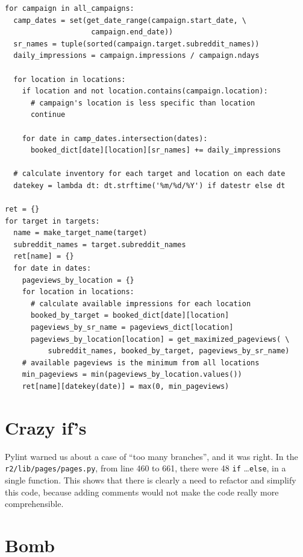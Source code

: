 \documentclass[11pt, a4paper]{article}
\newcommand{\pyl}{\textsf{Pylint}}
\begin{document}
\begin{lstlisting}[caption=\texttt{r2/lib/inventory.py} at lines 261-292]
for campaign in all_campaigns:
  camp_dates = set(get_date_range(campaign.start_date, \
					campaign.end_date))
  sr_names = tuple(sorted(campaign.target.subreddit_names))
  daily_impressions = campaign.impressions / campaign.ndays

  for location in locations:
    if location and not location.contains(campaign.location):
      # campaign's location is less specific than location
      continue

    for date in camp_dates.intersection(dates):
      booked_dict[date][location][sr_names] += daily_impressions

  # calculate inventory for each target and location on each date
  datekey = lambda dt: dt.strftime('%m/%d/%Y') if datestr else dt

ret = {}
for target in targets:
  name = make_target_name(target)
  subreddit_names = target.subreddit_names
  ret[name] = {}
  for date in dates:
    pageviews_by_location = {}
    for location in locations:
      # calculate available impressions for each location
      booked_by_target = booked_dict[date][location]
      pageviews_by_sr_name = pageviews_dict[location]
      pageviews_by_location[location] = get_maximized_pageviews( \
          subreddit_names, booked_by_target, pageviews_by_sr_name)
    # available pageviews is the minimum from all locations
    min_pageviews = min(pageviews_by_location.values())
    ret[name][datekey(date)] = max(0, min_pageviews)
\end{lstlisting}



\section{Crazy if's}

\pyl{} warned us about a case of ``too many branches'', and it was right.
In the \texttt{r2/lib/pages/pages.py}, from line 460 to 661, there were 48 \lstinline|if| \dots \lstinline|else|, in a single function.
This shows that there is clearly a need to refactor and simplify this code, because adding comments would not make the code really more comprehensible.



\section{Bomb}
\end{document}
